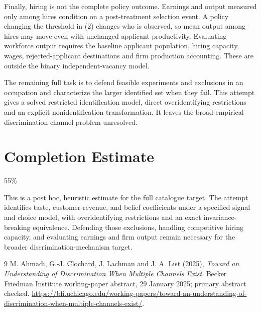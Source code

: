 \documentclass[11pt,a4paper]{article}
\begin{document}
Finally, hiring is not the complete policy outcome. Earnings and output measured only among hires condition on a post-treatment selection event. A policy changing the threshold in (2) changes who is observed, so mean output among hires may move even with unchanged applicant productivity. Evaluating workforce output requires the baseline applicant population, hiring capacity, wages, rejected-applicant destinations and firm production accounting. These are outside the binary independent-vacancy model.

The remaining full task is to defend feasible experiments and exclusions in an occupation and characterize the larger identified set when they fail. This attempt gives a solved restricted identification model, direct overidentifying restrictions and an explicit nonidentification transformation. It leaves the broad empirical discrimination-channel problem unresolved.

\section{Completion Estimate}
55\%

This is a post hoc, heuristic estimate for the full catalogue target.
The attempt identifies taste, customer-revenue, and belief coefficients under a specified signal and choice model, with overidentifying restrictions and an exact invariance-breaking equivalence. Defending those exclusions, handling competitive hiring capacity, and evaluating earnings and firm output remain necessary for the broader discrimination-mechanism target.

\begin{thebibliography}{9}
 M. Ahmadi, G.-J. Clochard, J. Lachman and J. A. List (2025), \emph{Toward an Understanding of Discrimination When Multiple Channels Exist}. Becker Friedman Institute working-paper abstract, 29 January 2025; primary abstract checked. \url{https://bfi.uchicago.edu/working-papers/toward-an-understanding-of-discrimination-when-multiple-channels-exist/}.
\end{thebibliography}
\end{document}
